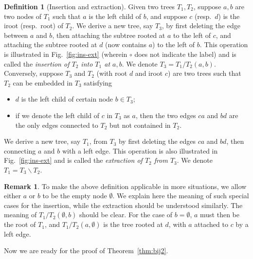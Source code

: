 \documentclass[12pt]{amsart}
\numberwithin{equation}{section}
\theoremstyle{plain}
\theoremstyle{definition}
\newtheorem{Def}[theorem]{Definition}
\newtheorem{remark}[theorem]{Remark}
\begin{document}
\begin{Def}[Insertion and extraction]
Given two trees $T_1,T_2$, suppose $a,b$ are two nodes of $T_1$ such that $a$ is the left child of $b$, and suppose $c$ (resp.~$d$) is the iroot (resp.~root) of $T_2$. We derive a new tree, say $T_3$, by first deleting the edge between $a$ and $b$, then attaching the subtree rooted at $a$ to the left of $c$, and attaching the subtree rooted at $d$ (now contains $a$) to the left of $b$. This operation is illustrated in Fig.~\ref{fig:ins-ext} (wherein $\circ$ does not indicate the label) and is called the {\em insertion of $T_2$ into $T_1$ at $a,b$}. We denote $T_3=T_1/T_2(a,b)$. Conversely, suppose $T_3$ and $T_2$ (with root $d$ and iroot $c$) are two trees such that $T_2$ can be embedded in $T_3$ satisfying
\begin{itemize}
	\item[i.] $d$ is the left child of certain node $b\in T_3$;
	\item[ii.] if we denote the left child of $c$ in $T_3$ as $a$, then the two edges $ca$ and $bd$ are the only edges connected to $T_2$ but not contained in $T_2$.
\end{itemize}
We derive a new tree, say $T_1$, from $T_3$ by first deleting the edges $ca$ and $bd$, then connecting $a$ and $b$ with a left edge. This operation is also illustrated in Fig.~\ref{fig:ins-ext} and is called the {\em extraction of $T_2$ from $T_3$}. We denote $T_1=T_3\backslash T_2$.
\end{Def}

\begin{remark}
To make the above definition applicable in more situations, we allow either $a$ or $b$ to be the empty node $\emptyset$. We explain here the meaning of such special cases for the insertion, while the extraction should be understood similarly. The meaning of $T_1/T_2(\emptyset,b)$ should be clear. For the case of $b=\emptyset$, $a$ must then be the root of $T_1$, and $T_1/T_2(a,\emptyset)$ is the tree rooted at $d$, with $a$ attached to $c$ by a left edge.
\end{remark}

Now we are ready for the proof of Theorem~\ref{thm:bij2}. 
\end{document}
